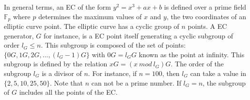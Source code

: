 In general terms, an EC of the form $y^2 = x^3 + ax + b$ is defined over a prime field $\mathbb{F}_p$ where $p$ determines the maximum values of $x$ and $y$, the two coordinates of an elliptic curve point. The elliptic curve has a cyclic group of $n$ points. A EC generator, $G$ for instance, is a EC point itself generating a cyclic subgroup of order $l_G \leq n$. This subgroup is composed of the set of points: $\{0G, 1G, 2G,...,(l_G-1)G\}$ with $0G = l_GG$ known as the point at infinity. This subgroup is defined by the relation $xG = (x ~mod~l_G)G$. The order of the subgroup $l_G$ is a divisor of $n$. For instance, if $n = 100$, then $l_G$ can take a value in $\{2, 5, 10, 25, 50\}$. Note that $n$ can not be a prime number. If $l_G = n$, the subgroup of $G$ includes all the points of the EC.\\

